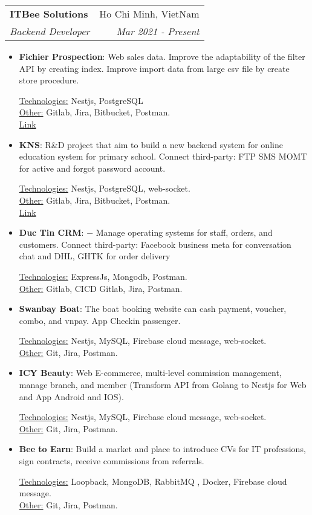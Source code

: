 \documentclass[letterpaper,11pt]{article}
\makeatletter
\newcommand{\resumeItem}[2]{
  \item\small{
    \textbf{#1}{: #2 \vspace{-2pt}}\\
  }
}
\newcommand{\resumeSubheading}[4]{
  \vspace{-1pt}\item
    \begin{tabular*}{0.97\textwidth}[t]{l@{\extracolsep{\fill}}r}
      \textbf{#1} & #2 \\
      \textit{\small#3} & \textit{\small #4} \\
    \end{tabular*}\vspace{-5pt}
}
\newcommand{\resumeSubSubheading}[2]{
    \begin{tabular*}{0.97\textwidth}{l@{\extracolsep{\fill}}r}
      \textit{\small#1} & \textit{\small #2} \\
    \end{tabular*}\vspace{-5pt}
}
\newcommand{\resumeSubHeadingListEnd}{\end{itemize}}
\newcommand{\resumeItemListStart}{\begin{itemize}}
\newcommand{\resumeItemListEnd}{\end{itemize}\vspace{-5pt}}
\newcommand{\resumeTech}[2]{
 \underline{#1:} #2\\
}
\newcommand{\resumeOther}[2]{
 \underline{#1:} #2\\
}
\makeatother
\begin{document}
    \resumeSubheading
      {ITBee Solutions}{Ho Chi Minh, VietNam}
      {Backend Developer}{Mar 2021 - Present}
      \resumeItemListStart
        \resumeItem{Fichier Prospection}
          {Web sales data. Improve the adaptability of the filter API by creating index. Improve import data from large csv file by create store procedure.}
          \resumeTech{Technologies}{Nestjs, PostgreSQL}
          \resumeOther{Other}{Gitlab, Jira, Bitbucket, Postman.}
          \href{https://fichier-prospection.online/}{Link}
        \resumeItem{KNS}
          {R\&D project that aim to build a new backend system for online education system for primary school. Connect third-party: FTP SMS MOMT for active and forgot password account.}
          \resumeTech{Technologies}{Nestjs, PostgreSQL, web-socket.}
          \resumeOther{Other}{Gitlab, Jira, Bitbucket, Postman.}
          \href{https://sanchoikns.vn/skills}{Link}
        \resumeItem{Duc Tin CRM}
          {−	Manage operating systems for staff, orders, and customers. Connect third-party: Facebook business meta for conversation chat and DHL, GHTK for order delivery}
          \resumeTech{Technologies}{ExpressJs, Mongodb, Postman.}
          \resumeOther{Other}{Gitlab, CICD Gitlab, Jira, Postman.}
        \resumeItem{Swanbay Boat}
          {The boat booking website can cash payment, voucher, combo, and vnpay. App Checkin passenger.}
          \resumeTech{Technologies}{Nestjs, MySQL, Firebase cloud message, web-socket.}
          \resumeOther{Other}{Git, Jira, Postman.}
        \resumeItem{ICY Beauty}
          {Web E-commerce, multi-level commission management, manage branch, and member (Transform API from Golang to Nestjs for Web and App Android and IOS).}
          \resumeTech{Technologies}{Nestjs, MySQL, Firebase cloud message, web-socket.}
          \resumeOther{Other}{Git, Jira, Postman.}
        \resumeItem{Bee to Earn}
          {Build a market and place to introduce CVs for IT professions, sign contracts, receive commissions from referrals.}
          \resumeTech{Technologies}{Loopback,  MongoDB, RabbitMQ , Docker, Firebase cloud message.}
          \resumeOther{Other}{Git, Jira, Postman.}
      \resumeItemListEnd
      
\end{document}
